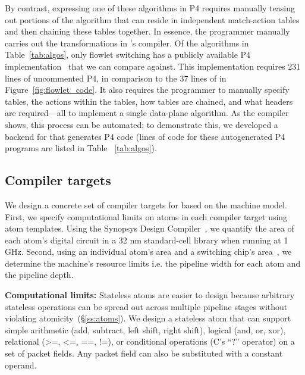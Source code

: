By contrast, expressing one of these algorithms in P4 requires manually teasing
out portions of the algorithm that can reside in independent match-action
tables and then chaining these tables together. In essence, the programmer
manually carries out the transformations in \pktlanguage's compiler. Of the
algorithms in Table~\ref{tab:algos}, only flowlet switching has a publicly
available P4 implementation~\cite{p4_flowlet} that we can compare against. This
implementation requires 231 lines of uncommented P4, in comparison to the 37
lines of \pktlanguage in Figure~\ref{fig:flowlet_code}. It also requires the
programmer to manually specify tables, the actions within the tables, how
tables are chained, and what headers are required---all to implement a single
data-plane algorithm. As the \pktlanguage compiler shows, this process can be
automated; to demonstrate this, we developed a backend for \pktlanguage that
generates P4 code (lines of code for these autogenerated P4 programs are listed
in Table ~\ref{tab:algos}).

\subsection{Compiler targets}
\label{ss:targets}

We design a concrete set of compiler targets for \pktlanguage based on the
\absmachine machine model. First, we specify computational limits on atoms in
each compiler target using atom templates. Using the Synopsys Design
Compiler~\cite{synopsys_dc}, we quantify the area of each atom's digital
circuit in a 32 nm standard-cell library when running at 1 GHz.  Second, using
an individual atom's area and a switching chip's area~\cite{gibb_parsing}, we
determine the machine's resource limits i.e. the pipeline width for each atom
and the pipeline depth.

\textbf{Computational limits:}
Stateless atoms are easier to design because arbitrary stateless operations can
be spread out across multiple pipeline stages without violating
atomicity~(\S\ref{ss:atoms}). We design a stateless atom that can support
simple arithmetic (add, subtract, left shift, right shift), logical (and, or,
xor), relational (>=, <=, ==, !=), or conditional operations (C's ``?''
operator) on a set of packet fields. Any packet field can also be substituted
with a constant operand.

